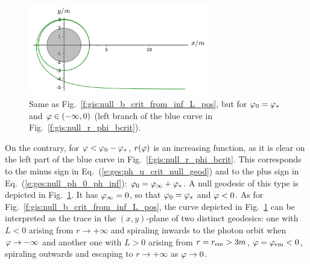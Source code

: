 \begin{figure}
\centerline{\includegraphics[width=0.7\textwidth]{ges_null_b_crit_from_inf_L_neg.pdf}}
\caption[]{\label{f:gis:null_b_crit_from_inf_L_neg} \footnotesize
Same as Fig.~\ref{f:gis:null_b_crit_from_inf_L_pos}, but for $\varphi_0 = \varphi_*$
and $\varphi\in(-\infty,0)$ (left branch of the blue curve in Fig.~\ref{f:gis:null_r_phi_bcrit}).}
\end{figure}

On the contrary, for $\varphi < \varphi_0 - \varphi_*$,
$r(\varphi)$ is an increasing
function, as it is clear on the left part of the blue curve in Fig.~\ref{f:gis:null_r_phi_bcrit}.
This corresponds to the
minus sign in Eq.~(\ref{e:ges:ph_u_crit_null_geod}) and to the plus sign in
Eq.~(\ref{e:ges:null_ph_0_ph_inf}): $\varphi_0 = \varphi_\infty + \varphi_*$.
A null geodesic of this type is depicted in Fig.~\ref{f:gis:null_b_crit_from_inf_L_neg}.
It has $\varphi_\infty = 0$, so that $\varphi_0 = \varphi_*$ and $\varphi < 0$.
As for Fig.~\ref{f:gis:null_b_crit_from_inf_L_pos}, the curve depicted in
Fig.~\ref{f:gis:null_b_crit_from_inf_L_neg} can be interpreted as the trace
in the $(x,y)$-plane of two distinct
geodesics: one with $L<0$ arising from $r\to + \infty$
and spiraling inwards to the photon orbit when $\varphi\to -\infty$
and another one with $L>0$
arising from $r=r_{\rm em} > 3 m$, $\varphi=\varphi_{\rm em}<0$,
spiraling outwards and escaping to $r\to +\infty$ as $\varphi\to 0$.

